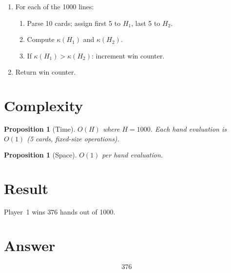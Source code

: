 \documentclass[12pt]{article}
\newtheorem{proposition}[theorem]{Proposition}
\theoremstyle{definition}
\begin{document}
\begin{enumerate}
    \item For each of the 1000 lines:
    \begin{enumerate}
        \item Parse 10 cards; assign first 5 to $H_1$, last 5 to $H_2$.
        \item Compute $\kappa(H_1)$ and $\kappa(H_2)$.
        \item If $\kappa(H_1) > \kappa(H_2)$: increment win counter.
    \end{enumerate}
    \item Return win counter.
\end{enumerate}

\section{Complexity}

\begin{proposition}[Time]
$O(H)$ where $H = 1000$. Each hand evaluation is $O(1)$ (5 cards, fixed-size operations).
\end{proposition}

\begin{proposition}[Space]
$O(1)$ per hand evaluation.
\end{proposition}

\section{Result}
Player~1 wins $\boxed{376}$ hands out of 1000.

\section{Answer}

\[
\boxed{376}
\]
\end{document}

